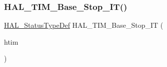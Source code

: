 \subsubsection{\texorpdfstring{H\+A\+L\+\_\+\+T\+I\+M\+\_\+\+Base\+\_\+\+Stop\+\_\+\+I\+T()}{HAL\_TIM\_Base\_Stop\_IT()}}
{\footnotesize\ttfamily \hyperlink{stm32f4xx__hal__def_8h_a63c0679d1cb8b8c684fbb0632743478f}{H\+A\+L\+\_\+\+Status\+Type\+Def} H\+A\+L\+\_\+\+T\+I\+M\+\_\+\+Base\+\_\+\+Stop\+\_\+\+IT (\begin{DoxyParamCaption}\item[{\hyperlink{struct_t_i_m___handle_type_def}{T\+I\+M\+\_\+\+Handle\+Type\+Def} $\ast$}]{htim }\end{DoxyParamCaption})}

